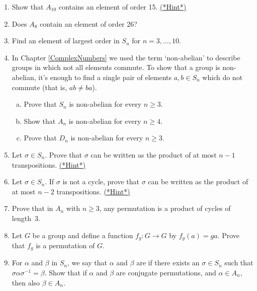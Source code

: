  
\begin{enumerate}
 
  
\item \label{ex:permute:Ad1}
Show that $A_{10}$ contains an element of order 15.
\hyperref[sec:permute:hints]{(*Hint*)}
 
 
\item
Does $A_8$ contain an element of order 26?
 
 
\item %
Find an element of largest order in $S_n$ for $n = 3, \ldots, 10$. 
 
  
 \item
In Chapter \ref{ComplexNumbers} we used the term `non-abelian' to describe groups in which not all elements commute. To show that a group is non-abelian, it's enough to find a single pair of elements $a, b \in S_n$ which do not commute (that is, $ab \neq ba$).
\begin{enumerate}[(a)]
\item
Prove that $S_n$ is non-abelian for every $n \geq 3$. 
\item
Show that $A_n$ is non-abelian for every $n \geq 4$.
\item
Prove that $D_n$ is non-abelian for every $n \geq 3$.
 \end{enumerate} 



\item \label{ex:permute:Ad2}
Let $\sigma \in S_n$. Prove that $\sigma$ can be written as the
product of at most $n-1$ transpositions.
\hyperref[sec:permute:hints]{(*Hint*)}

\item \label{ex:permute:Ad3}
Let $\sigma \in S_n$. If $\sigma$ is not a cycle, prove that $\sigma$
can be written as the product of at most $n-2$ transpositions.
\hyperref[sec:permute:hints]{(*Hint*)}
  
\item
Prove that in $A_n$ with $n \geq 3$, any permutation is a product of
cycles of length~3.  
 
 
\item
Let $G$ be a group and define a function $f_g : G \rightarrow G$ by
$f_g(a) = g a$.  Prove that $f_g$ is a permutation of $G$.
 
 
\item
For $\alpha$ and $\beta$ in $S_n$, we say that $\alpha$ and $ \beta$ are
if there
exists an $\sigma \in S_n$ such that $\sigma \alpha \sigma^{-1} =
\beta$.  
Show that if $\alpha$ and  $\beta$ are conjugate permutations, and $\alpha \in A_n$, then also  $\beta \in A_n$.


\end{enumerate}
